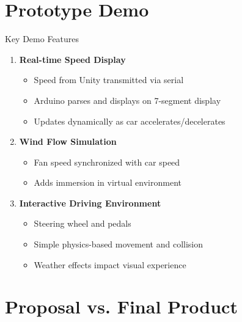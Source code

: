 \documentclass[aspectratio=169]{beamer}
\newenvironment{tlist}{\begin{itemize}}{\end{itemize}}
\begin{document}
\section{Prototype Demo}

\begin{frame}{Key Demo Features}
\begin{enumerate}
    \item \textbf{Real-time Speed Display}
    \begin{tlist}
        \item Speed from Unity transmitted via serial
        \item Arduino parses and displays on 7-segment display
        \item Updates dynamically as car accelerates/decelerates
    \end{tlist}
    
    \item \textbf{Wind Flow Simulation}
    \begin{tlist}
        \item Fan speed synchronized with car speed
        \item Adds immersion in virtual environment
    \end{tlist}
    
    \item \textbf{Interactive Driving Environment}
    \begin{tlist}
        \item Steering wheel and pedals
        \item Simple physics-based movement and collision
        \item Weather effects impact visual experience
    \end{tlist}
\end{enumerate}
\end{frame}

\section{Proposal vs. Final Product}
\end{document}
